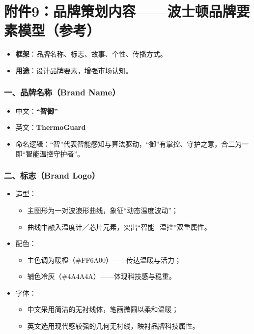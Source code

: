\documentclass[UTF8]{report}
\theoremstyle{MyLineTheoremStyle} %
\theoremstyle{MyBlockTheoremStyle} %
\theoremstyle{MySubsubsectionStyle} %
\begin{document}
\section{附件9：品牌策划内容——波士顿品牌要素模型（参考）}
\begin{itemize}
    \item \textbf{框架}：品牌名称、标志、故事、个性、传播方式。
    \item \textbf{用途}：设计品牌要素，增强市场认知。
\end{itemize}

  \subsubsection{一、品牌名称（Brand Name）}
    \begin{itemize}
      \item 中文：\textbf{“智御”}  
      \item 英文：\textbf{ThermoGuard}  
      \item 命名逻辑：“智”代表智能感知与算法驱动，“御”有掌控、守护之意，合二为一即“智能温控守护者”。
    \end{itemize}

  \subsubsection{二、标志（Brand Logo）}
    \begin{itemize}
      \item 造型：  
        \begin{itemize}
          \item 主图形为一对波浪形曲线，象征“动态温度波动”；  
          \item 曲线中融入温度计／芯片元素，突出“智能+温控”双重属性。  
        \end{itemize}
      \item 配色：  
        \begin{itemize}
          \item 主色调为暖橙（\#FF6A00）——传达温暖与活力；  
          \item 辅色冷灰（\#4A4A4A）——体现科技感与稳重。
        \end{itemize}
      \item 字体：   		
        \begin{itemize}
          \item 中文采用简洁的无衬线体，笔画微圆以柔和温暖；  
          \item 英文选用现代感较强的几何无衬线，映衬品牌科技属性。
        \end{itemize}
    \end{itemize}
\end{document}
